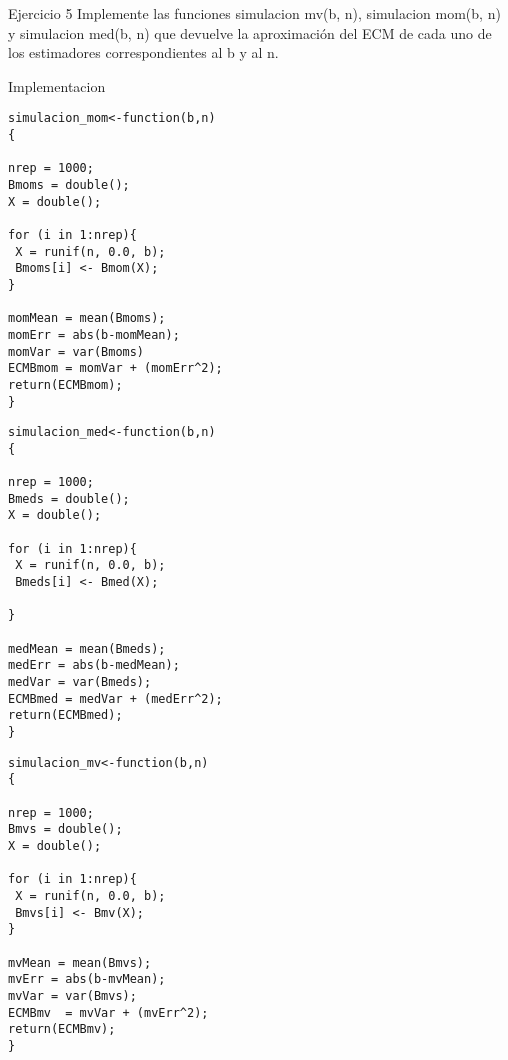 



\begin{section}{Ejercicio 5}
Implemente las funciones simulacion mv(b, n), simulacion mom(b, n) y simulacion med(b, n)
que devuelve la aproximación del ECM de cada uno de los estimadores correspondientes al b
y al n.

\begin{subsection}{Implementacion}



\begin{verbatim}
simulacion_mom<-function(b,n)
{

nrep = 1000;
Bmoms = double();
X = double();

for (i in 1:nrep){
 X = runif(n, 0.0, b);
 Bmoms[i] <- Bmom(X);
}

momMean = mean(Bmoms);
momErr = abs(b-momMean);
momVar = var(Bmoms)
ECMBmom = momVar + (momErr^2);
return(ECMBmom);
}
\end{verbatim}


\begin{verbatim}
simulacion_med<-function(b,n)
{

nrep = 1000;
Bmeds = double();
X = double();

for (i in 1:nrep){
 X = runif(n, 0.0, b);
 Bmeds[i] <- Bmed(X);

}

medMean = mean(Bmeds);
medErr = abs(b-medMean);
medVar = var(Bmeds);
ECMBmed = medVar + (medErr^2);
return(ECMBmed);
}
\end{verbatim}


\begin{verbatim}
simulacion_mv<-function(b,n)
{

nrep = 1000;
Bmvs = double();
X = double();

for (i in 1:nrep){
 X = runif(n, 0.0, b);
 Bmvs[i] <- Bmv(X);
}

mvMean = mean(Bmvs);
mvErr = abs(b-mvMean);
mvVar = var(Bmvs);
ECMBmv  = mvVar + (mvErr^2);
return(ECMBmv);
}
\end{verbatim}


\end{subsection}
\end{section}